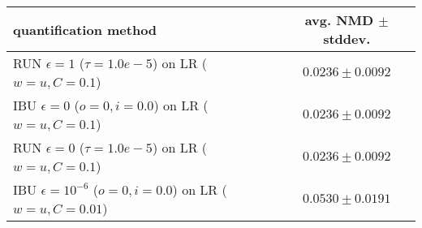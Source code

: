 \begin{tabular}{lc}
  \toprule
  quantification method & avg. NMD $\pm$ stddev. \\
  \midrule
  RUN $\epsilon=1$ ($\tau=1.0e-5$) on LR ($w=u, C=0.1$) & $\mathbf{0.0236 \pm 0.0092}$ \\
  IBU $\epsilon=0$ ($o=0, i=0.0$) on LR ($w=u, C=0.1$) & $0.0236 \pm 0.0092$ \\
  RUN $\epsilon=0$ ($\tau=1.0e-5$) on LR ($w=u, C=0.1$) & $0.0236 \pm 0.0092$ \\
  IBU $\epsilon=10^{-6}$ ($o=0, i=0.0$) on LR ($w=u, C=0.01$) & $0.0530 \pm 0.0191$ \\
  \bottomrule
\end{tabular}
